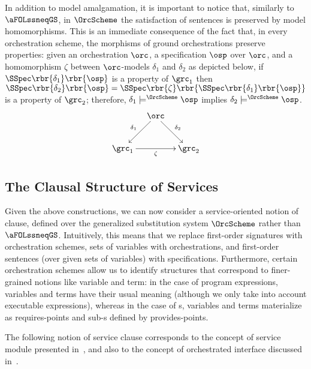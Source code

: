 \documentclass{LMCS}
\begin{document}
  \begin{rem}
    \label{remark:preservation-of-satisfaction-in-OrcScheme}
    In addition to model amalgamation, it is important to notice that, similarly to \(\aFOLssneqGS\), in \(\OrcScheme\) the satisfaction of sentences is preserved by model homomorphisms.
    This is an immediate consequence of the fact that, in every orchestration scheme, the morphisms of ground orchestrations preserve properties: given an orchestration \(\orc\), a specification \(\osp\) over \(\orc\), and a homomorphism \(\zeta\) between \(\orc\)\nb-models \(\delta_{1}\) and \(\delta_{2}\) as depicted below, if \(\SSpec\rbr{\delta_{1}}\rbr{\osp}\) is a property of \(\grc_{1}\) then \(\SSpec\rbr{\delta_{2}}\rbr{\osp} = \SSpec\rbr{\zeta}\rbr{\SSpec\rbr{\delta_{1}}\rbr{\osp}}\) is a property of \(\grc_{2}\); therefore, \(\delta_{1} \models^{\OrcScheme} \osp\) implies \(\delta_{2} \models^{\OrcScheme} \osp\).
    \[
    \xymatrix @C=1em {
      & {\orc}
      \ar [dl] _{\delta_{1}}
      \ar [dr] ^{\delta_{2}}
      \\
      {\grc_{1}}
      \ar [rr] _{\zeta}
      && {\grc_{2}}
    }
    \]
  \end{rem}


  \subsection{The Clausal Structure of Services}

  Given the above constructions, we can now consider a service-oriented notion of clause, defined over the generalized substitution system \(\OrcScheme\) rather than \(\aFOLssneqGS\).
  Intuitively, this means that we replace first-order signatures with orchestration schemes, sets of variables with orchestrations, and first-order sentences (over given sets of variables) with specifications.  Furthermore, certain orchestration schemes allow us to identify structures that correspond to finer-grained notions like variable and term: in the case of program expressions, variables and terms have their usual meaning (although we only take into account executable expressions), whereas in the case of s, variables and terms materialize as requires-points and sub-s defined by provides-points.

  The following notion of service clause corresponds to the concept of service module presented in~\cite{Fiadeiro-Lopes-Bocchi:An-abstract-model-for-service-discovery-and-binding-2011}, and also to the concept of orchestrated interface discussed in~\cite{Fiadeiro-Lopes:An-interface-theory-for-service-oriented-design-2013}.
\end{document}
